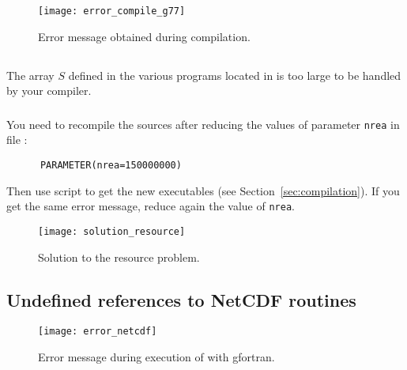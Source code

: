 \begin{figure}[htpb]
\centering
\texttt{[image: error\_compile\_g77]}
\caption{Error message obtained during compilation. \label{fig:error_compile}}
\end{figure}

\subsection{\question}

The array $S$ defined in the various programs located in  is too large to be handled by your compiler. 


\subsubsection{\answer}

You need to recompile the sources after reducing the values of parameter \texttt{nrea} in file :
\begin{verbatim}
      PARAMETER(nrea=150000000)
\end{verbatim}
Then use script  to get the new executables (see Section~\ref{sec:compilation}). If you get the same error message, reduce again the value of \texttt{nrea}.

\begin{figure}[htpb]
\centering
\texttt{[image: solution\_resource]}
\caption{Solution to the resource problem.}
\end{figure}


\subsection{Undefined references to NetCDF routines\label{sec:error_netcdf}}

\begin{figure}[htpb]
\centering
\texttt{[image: error\_netcdf]}
\caption{Error message during execution of  with gfortran\label{fig:error_netcdf}.}
\end{figure}

\subsubsection{\question}

